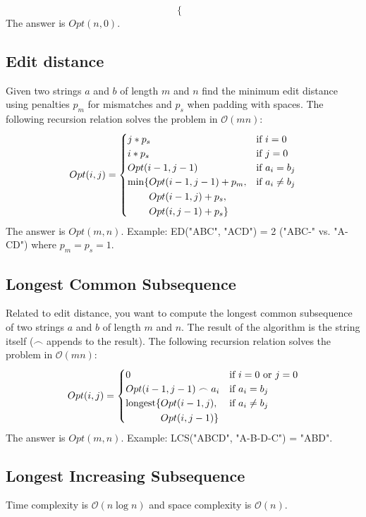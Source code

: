 \documentclass[8pt,a4paper,landscape,oneside]{amsart}
\newcommand{\code}[1]{\inputminted[fontsize=\normalsize,baselinestretch=1]{java}{code/#1}}
\newcommand{\bigO}{\mathcal{O}}
\begin{document}
\begin{multicols*}{3}
\[\begin{cases}
  \end{cases}
  \]
  The answer is $Opt(n, 0)$.
  
  \subsection{Edit distance}
  Given two strings $a$ and $b$ of length $m$ and $n$ find the minimum edit distance using penalties $p_m$ for mismatches and $p_s$ when padding with spaces. The following recursion relation solves the problem in $\bigO(mn)$:
  \[
  Opt(i,j) = \begin{cases}
  j*p_s & \text{if } i=0 \\
  i*p_s & \text{if } j=0 \\
  Opt(i-1,j-1) & \text{if } a_i=b_j \\
  \begin{aligned}[t]\arraycolsep=0pt
    \min\lbrace &
      Opt(i-1,j-1) + p_m, \\ &
      Opt(i-1,j) + p_s, \\ & 
      Opt(i,j-1) + p_s \rbrace
  \end{aligned} & \text{if } a_i\neq b_j
  \end{cases}
  \]
  The answer is $Opt(m,n)$. Example: ED("ABC", "ACD") = 2 ("ABC-" vs. "A-CD") where $p_m = p_s = 1$.
  
  \subsection{Longest Common Subsequence}
  Related to edit distance, you want to compute the longest common subsequence of two strings $a$ and $b$ of length $m$ and $n$. The result of the algorithm is the string itself ($\frown$ appends to the result). The following recursion relation solves the problem in $\bigO(mn)$:
  \[
  Opt(i,j) = \begin{cases}
  0 & \text{if } i=0 \text{ or } j=0 \\
  Opt(i-1,j-1) \frown a_i & \text{if } a_i=b_j \\
  \begin{aligned}[t]\arraycolsep=0pt
    \mathrm{longest}\lbrace &
      Opt(i-1,j), \\ & 
      Opt(i,j-1) \rbrace
  \end{aligned} & \text{if } a_i\neq b_j
  \end{cases}
  \]
  The answer is $Opt(m,n)$. Example: LCS("ABCD", "A-B-D-C") = "ABD".
  
  \subsection{Longest Increasing Subsequence}
  Time complexity is $\bigO(n\log n)$ and space complexity is $\bigO(n)$.
  \code{DP/LongestIncreasingSubsequence.java}
  

\end{multicols*}
\end{document}
